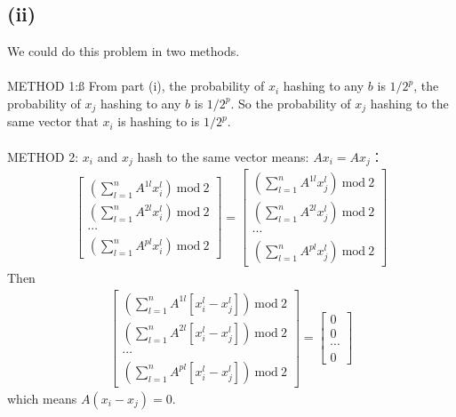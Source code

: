 \documentclass[twoside,11pt]{homework}
\begin{document}
\subsection*{(ii)}
We could do this problem in two methods.
\\\\
METHOD 1:ß
From part (i), the probability of $x_i$ hashing to any $b$ is $1/2^p$, the probability of $x_j$ hashing to any $b$ is $1/2^p$.
So the probability of $x_j$ hashing to the same vector that $x_i$ is hashing to is $1/2^p$.
\\\\
METHOD 2:
$x_i$ and $x_j$ hash to the same vector means: $A x_i = A x_j$：
%
\begin{equation}
\begin{split}
\left[\begin{matrix} (\sum\limits_{l=1}^n A^{1l} x_i^l)\ \mathrm{mod}\ 2\\ (\sum\limits_{l=1}^n A^{2l} x_i^l)\ \mathrm{mod}\ 2\\ \cdots \\ (\sum\limits_{l=1}^n A^{pl} x_i^l)\ \mathrm{mod}\ 2 \end{matrix} \right]
= \left[\begin{matrix} (\sum\limits_{l=1}^n A^{1l} x_j^l)\ \mathrm{mod}\ 2\\ (\sum\limits_{l=1}^n A^{2l} x_j^l)\ \mathrm{mod}\ 2\\ \cdots \\ (\sum\limits_{l=1}^n A^{pl} x_j^l)\ \mathrm{mod}\ 2 \end{matrix} \right]
\end{split}
\end{equation}
%
Then
%
\begin{equation}
\begin{split}
\left[\begin{matrix} (\sum\limits_{l=1}^n A^{1l} [x_i^l  - x_j^l])\ \mathrm{mod}\ 2\\ (\sum\limits_{l=1}^n A^{2l} [x_i^l  - x_j^l])\ \mathrm{mod}\ 2\\ \cdots \\ (\sum\limits_{l=1}^n A^{pl} [x_i^l  - x_j^l])\ \mathrm{mod}\ 2 \end{matrix} \right]
= \left[\begin{matrix} 0\\ 0\\ \cdots \\0\end{matrix} \right]
\end{split}
\end{equation}
%
which means $A(x_i - x_j) = 0$.
\end{document}
